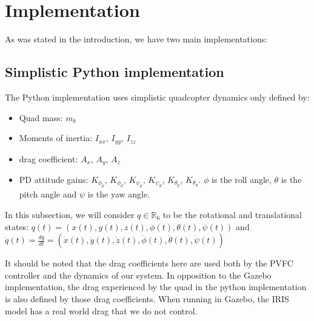 \section{Implementation}
\label{Implementation section}
As was stated in the introduction, we have two main implementations: 
\subsection{Simplistic Python implementation}
The Python implementation uses simplistic quadcopter dynamics only defined by:
\begin{itemize}
    \item Quad mass: $m_b$
    \item Moments of inertia: $I_{xx}$, $I_{yy}$, $I_{zz}$
    \item drag coefficient: $A_{x}$, $A_{y}$, $A_{z}$
    \item PD attitude gains: $K_{\phi_{p}}$, $K_{\phi_{d}}$, $K_{\psi_{p}}$, $K_{\psi_{d}}$, $K_{\theta_{p}}$, $K_{\theta_{d}}$. $\phi$ is the roll angle, $\theta$ is the pitch angle and $\psi$ is the yaw angle.
\end{itemize}

In this subsection, we will consider $q\in\mathbb{R}_6$ to be the rotational and translational states: $q(t) = (x(t), y(t), z(t), \phi(t), \theta(t), \psi(t))$
and $\dot{q}(t) = \frac{dq}{dt} = (\dot{x}(t), \dot{y}(t), \dot{z}(t), \dot{\phi}(t), \dot{\theta}(t), \dot{\psi}(t))$

It should be noted that the drag coefficients here are used both by the PVFC controller and the dynamics of our system. 
In opposition to the Gazebo implementation, the drag experienced by the quad in the python implementation is also defined by those drag coefficients.
When running in Gazebo, the IRIS model has a real world drag that we do not control.

